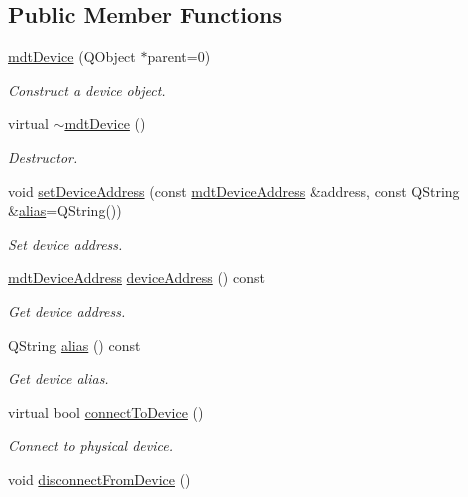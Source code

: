 \subsection*{Public Member Functions}
\begin{DoxyCompactItemize}
\item 
\hyperlink{classmdt_device_a6d501791e7243358cc61b144254b80db}{mdt\-Device} (Q\-Object $\ast$parent=0)
\begin{DoxyCompactList}\small\item\em Construct a device object. \end{DoxyCompactList}\item 
virtual \hyperlink{classmdt_device_ac2a9cfd6042f3f9d8da4e84f044d3f4a}{$\sim$mdt\-Device} ()
\begin{DoxyCompactList}\small\item\em Destructor. \end{DoxyCompactList}\item 
void \hyperlink{classmdt_device_a3fdad460ae0eac5710b13e400156cb1d}{set\-Device\-Address} (const \hyperlink{classmdt_device_address}{mdt\-Device\-Address} \&address, const Q\-String \&\hyperlink{classmdt_device_a3aa589ecae0fa3deed61431d07db9276}{alias}=Q\-String())
\begin{DoxyCompactList}\small\item\em Set device address. \end{DoxyCompactList}\item 
\hyperlink{classmdt_device_address}{mdt\-Device\-Address} \hyperlink{classmdt_device_af04ef3dc643127325597af46494ffb6b}{device\-Address} () const 
\begin{DoxyCompactList}\small\item\em Get device address. \end{DoxyCompactList}\item 
Q\-String \hyperlink{classmdt_device_a3aa589ecae0fa3deed61431d07db9276}{alias} () const 
\begin{DoxyCompactList}\small\item\em Get device alias. \end{DoxyCompactList}\item 
virtual bool \hyperlink{classmdt_device_a0c265d9078bf50708aa60a73b5125667}{connect\-To\-Device} ()
\begin{DoxyCompactList}\small\item\em Connect to physical device. \end{DoxyCompactList}\item 
void \hyperlink{classmdt_device_a2b694a37d9464d27214bdeceec220998}{disconnect\-From\-Device} ()

\end{DoxyCompactItemize}
